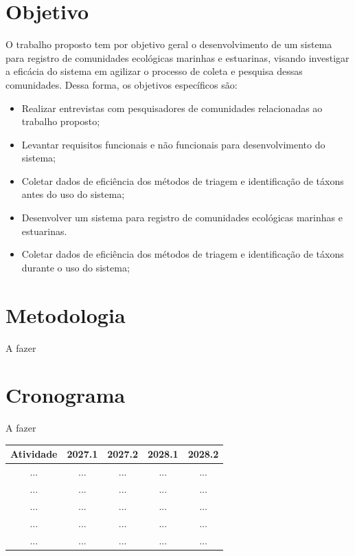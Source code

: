 \documentclass[
	12pt,				%
	openright,			%
	twoside,			%
	a4paper,			%
	english,			%
	french,				%
	spanish,			%
	brazilian,				%
	]{abntex2}
\begin{document}
\section{Objetivo}
O trabalho proposto tem por objetivo geral o desenvolvimento de um sistema para registro de comunidades ecológicas marinhas e estuarinas, visando investigar a eficácia do sistema em agilizar o processo de coleta e pesquisa dessas comunidades. Dessa forma, os objetivos específicos são:
\begin{itemize}
\item Realizar entrevistas com pesquisadores de comunidades relacionadas ao trabalho proposto;
\item Levantar requisitos funcionais e não funcionais para desenvolvimento do sistema;
\item Coletar dados de eficiência dos métodos de triagem e identificação de táxons antes do uso do sistema;
\item Desenvolver um sistema para registro de comunidades ecológicas marinhas e estuarinas.
\item Coletar dados de eficiência dos métodos de triagem e identificação de táxons durante o uso do sistema;
\end{itemize}
\section{Metodologia}
A fazer
\section{Cronograma}
A fazer
\begin{quadro}
\caption{\label{quadro_exemplo}Cronograma de atividades}
\begin{tabular}{|c|c|c|c|c|}
	\hline
  \textbf{Atividade} & \textbf{2027.1} & \textbf{2027.2} & \textbf{2028.1} & \textbf{2028.2} \\ \hline
	...    & ...   & ...  & ...  & ... \\ \hline
	...    & ...   & ...  & ...  & ... \\ \hline
	...    & ...   & ...  & ...  & ... \\ \hline
	...    & ...   & ...  & ...  & ... \\ \hline
	...    & ...   & ...  & ...  & ... \\ \hline
\end{tabular}
\end{quadro}

\cleardoublepage


\end{document}
